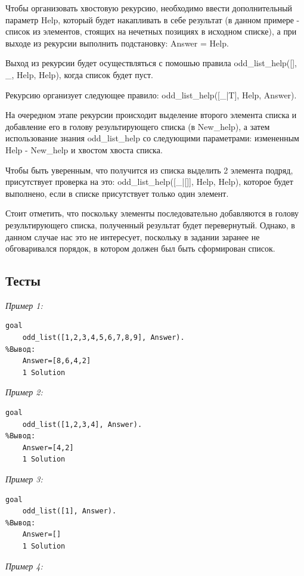 \documentclass[a4paper,12pt]{article}
\begin{document}
Чтобы организовать хвостовую рекурсию, необходимо ввести дополнительный параметр Help, который будет накапливать в себе результат (в данном примере - список из элементов, стоящих на нечетных позициях в исходном списке), а при выходе из рекурсии выполнить подстановку: Answer = Help.

Выход из рекурсии будет осуществляться с помошью правила odd\_list\_help([], \_, Help, Help), когда список будет пуст.

Рекурсию организует следующее правило: odd\_list\_help([\_|T], Help, Answer).

На очередном этапе рекурсии происходит выделение второго элемента списка и добавление его в голову результирующего списка (в New\_help), а затем использование знания odd\_list\_help со следующими параметрами: измененным Help - New\_help и хвостом хвоста списка.

Чтобы быть уверенным, что получится из списка выделить 2 элемента подряд, присутствует проверка на это: odd\_list\_help([\_|[]], Help, Help), которое будет выполнено, если в списке присутствует только один элемент.

Стоит отметить, что поскольку элементы последовательно добавляются в голову результирующего списка, полученный результат будет перевернутый. Однако, в данном случае нас это не интересует, поскольку в задании заранее не обговаривался порядок, в котором должен был быть сформирован список.

\subsection*{Тесты}

\textit{Пример 1:}

\begin{verbatim}
goal
	odd_list([1,2,3,4,5,6,7,8,9], Answer).
%Вывод:
	Answer=[8,6,4,2]
	1 Solution
\end{verbatim}

\textit{Пример 2:}

\begin{verbatim}
goal
	odd_list([1,2,3,4], Answer).
%Вывод:
	Answer=[4,2]
	1 Solution
\end{verbatim}

\textit{Пример 3:}

\begin{verbatim}
goal
	odd_list([1], Answer).
%Вывод:
	Answer=[]
	1 Solution
\end{verbatim}

\textit{Пример 4:}
\end{document}
